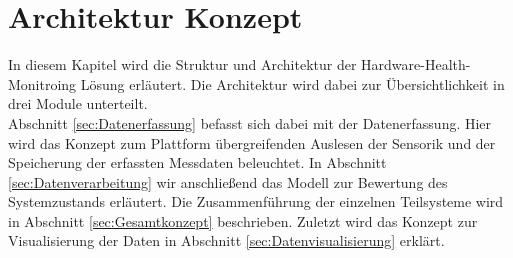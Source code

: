 \chapter{Architektur Konzept}
In diesem Kapitel wird die Struktur und Architektur der Hardware-Health-Monitroing Lösung erläutert. Die Architektur wird dabei zur Übersichtlichkeit in drei Module unterteilt.\\
Abschnitt \ref{sec:Datenerfassung} befasst sich dabei mit der Datenerfassung. Hier wird das Konzept zum Plattform übergreifenden Auslesen der Sensorik und der Speicherung der erfassten Messdaten beleuchtet. In Abschnitt \ref{sec:Datenverarbeitung} wir anschließend das Modell zur Bewertung des Systemzustands erläutert.
Die Zusammenführung der einzelnen Teilsysteme wird in Abschnitt \ref{sec:Gesamtkonzept} beschrieben. Zuletzt wird das Konzept zur Visualisierung der Daten in Abschnitt \ref{sec:Datenvisualisierung} erklärt. 
